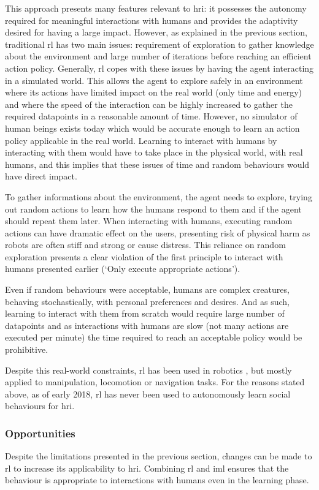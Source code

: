 	This approach presents many features relevant to \gls{hri}: it possesses the autonomy required for meaningful interactions with humans and provides the adaptivity desired for having a large impact. However, as explained in the previous section, traditional \gls{rl} has two main issues: requirement of exploration to gather knowledge about the environment and large number of iterations before reaching an efficient action policy. Generally, \gls{rl} copes with these issues by having the agent interacting in a simulated world. This allows the agent to explore safely in an environment where its actions have limited impact on the real world (only time and energy) and where the speed of the interaction can be highly increased to gather the required datapoints in a reasonable amount of time. However, no simulator of human beings exists today which would be accurate enough to learn an action policy applicable in the real world. Learning to interact with humans by interacting with them would have to take place in the physical world, with real humans, and this implies that these issues of time and random behaviours would have direct impact. 
	
	To gather informations about the environment, the agent needs to explore, trying out random actions to learn how the humans respond to them and if the agent should repeat them later. When interacting with humans, executing random actions can have dramatic effect on the users, presenting risk of physical harm as robots are often stiff and strong or cause distress. This reliance on random exploration presents a clear violation of the first principle to interact with humans presented earlier (`Only execute appropriate actions').
	
	Even if random behaviours were acceptable, humans are complex creatures, behaving stochastically, with personal preferences and desires. And as such, learning to interact with them from scratch would require large number of datapoints and as interactions with humans are slow (not many actions are executed per minute) the time required to reach an acceptable policy would be prohibitive. 
	
	Despite this real-world constraints, \gls{rl} has been used in robotics \citep{kober2013reinforcement}, but mostly applied to manipulation, locomotion or navigation tasks. For the reasons stated above, as of early 2018, \gls{rl} has never been used to autonomously learn social behaviours for \gls{hri}. 
	
	\subsubsection{Opportunities}  
	Despite the limitations presented in the previous section, changes can be made to \gls{rl} to increase its applicability to \gls{hri}. Combining \gls{rl} and \gls{iml} ensures that the behaviour is appropriate to interactions with humans even in the learning phase.
	
